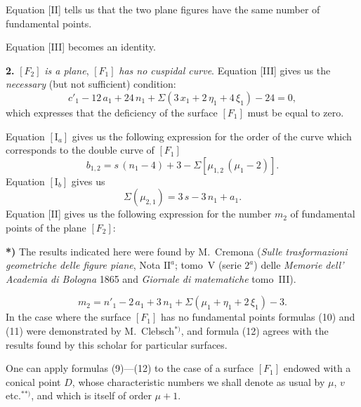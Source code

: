 \documentclass{article}
\begin{document}
Equation [II] tells us that the two plane figures have the same number of fundamental points.

Equation [III] becomes an identity.

\textbf{2.} $[F_2]$ \emph{is a plane}, $[F_1]$ \emph{has no cuspidal curve}. Equation [III] gives us the \emph{necessary} (but not sufficient) condition:
\[
c'_1 - 12\,a_1 + 24\,n_1 + \Sigma(3\,x_1 + 2\,\eta_1 + 4\,\xi_1) - 24 = 0, \tag{9}
\]
which expresses that the deficiency of the surface $[F_1]$ must be equal to zero.

Equation $[\mathrm{I}_a]$ gives us the following expression for the order of the curve which corresponds to the double curve of $[F_1]$
\[
b_{1, 2} = s\,(n_1 - 4) + 3 - \Sigma[\mu_{1, 2}\,(\mu_1 - 2)]. \tag{10}
\]
Equation $[\mathrm{I}_b]$ gives us
\[
\Sigma(\mu_{2, 1}) = 3\,s - 3\,n_1 + a_1. \tag{11}
\]
Equation [II] gives us the following expression for the number $m_2$ of fundamental points of the plane $[F_2]$:

\textbf{*)} The results indicated here were found by M.~Cremona (\emph{Sulle trasformazioni geometriche delle figure piane}, Nota $\mathrm{II}^a$; tomo~V (serie $2^a$) delle \emph{Memorie dell' Academia di Bologna} 1865 and \emph{Giornale di matematiche} tomo~III).

\[
m_2 = n'_1 - 2\,a_1 + 3\,n_1 + \Sigma(\mu_1 + \eta_1 + 2\,\xi_1) - 3. \tag{12}
\]
In the case where the surface $[F_1]$ has no fundamental points formulas (10) and (11) were demonstrated by M.~Clebsch${}^{*)}$, and formula (12) agrees with the results found by this scholar for particular surfaces.

One can apply formulas (9)---(12) to the case of a surface $[F_1]$ endowed with a conical point $D$, whose characteristic numbers we shall denote as usual by $\mu$, $v$ etc.${}^{**)}$, and which is itself of order $\mu + 1$.
\end{document}
